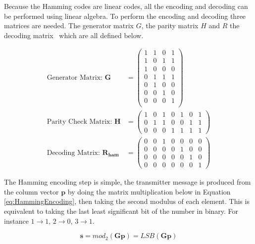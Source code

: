 \documentclass[12pt,onecolumn,letterpaper]{article}
\begin{document}
Because the Hamming codes are linear codes, all the encoding and decoding can be performed using linear algebra. To perform the encoding and decoding three matrices are needed. The generator matrix $G$, the parity matrix $H$ and $R$ the decoding matrix~\cite{HammingMoonBook} which are all defined below.

\begin{align}
   \mbox{Generator Matrix: }\mathbf{G} &= \begin{pmatrix}
      1 & 1 & 0 & 1\\ 
      1 & 0 & 1 & 1\\ 
      1 & 0 & 0 & 0\\ 
      0 & 1 & 1 & 1\\ 
      0 & 1 & 0 & 0\\ 
      0 & 0 & 1 & 0\\ 
      0 & 0 & 0 & 1 \\
      \end{pmatrix} \\
   \mbox{Parity Check Matrix: }\mathbf{H} &= \begin{pmatrix}
      1 & 0 & 1 & 0 & 1 & 0 & 1\\ 
      0 & 1 & 1 & 0 & 0 & 1 & 1\\ 
      0 & 0 & 0 & 1 & 1 & 1 & 1
      \end{pmatrix} \\
   \mbox{Decoding Matrix: }\mathbf{R_{ham}} &= \begin{pmatrix}
      0 & 0 & 1 & 0 & 0 & 0 & 0\\ 
      0 & 0 & 0 & 0 & 1 & 0 & 0\\ 
      0 & 0 & 0 & 0 & 0 & 1 & 0\\ 
      0 & 0 & 0 & 0 & 0 & 0 & 1
      \end{pmatrix}
\end{align}

The Hamming encoding step is simple, the transmitter message is produced from the column vector $\mathbf{p}$ by doing the matrix multiplication below in Equation \ref{eq:HammingEncoding}, then taking the second modulus of each element. This is equivalent to taking the last least significant bit of the number in binary. For instance $1 \rightarrow 1$, $2 \rightarrow 0$, $3 \rightarrow 1$.

\begin{equation}
   \mathbf{s} = mod_2(\mathbf{Gp}) = LSB(\mathbf{Gp})
   \label{eq:HammingEncoding}
\end{equation}
\end{document}
